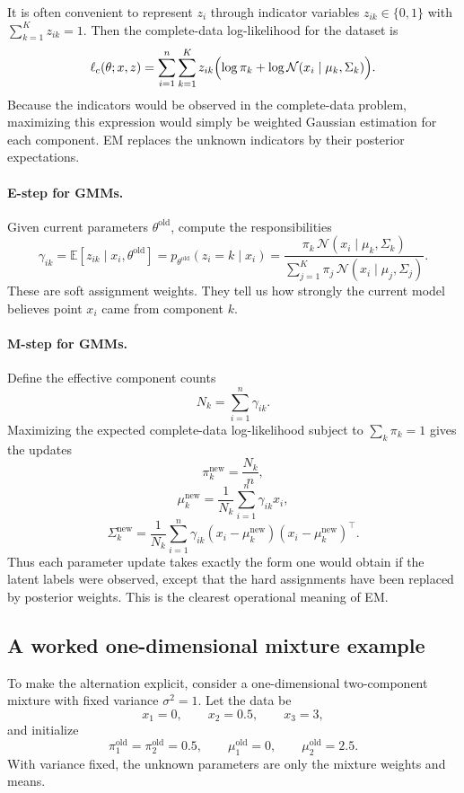 It is often convenient to represent $z_i$ through indicator variables $z_{ik}\in\{0,1\}$ with $\sum_{k=1}^K z_{ik}=1$.
Then the complete-data log-likelihood for the dataset is
\[
\ell_c(\theta;x,z)
=
\sum_{i=1}^n\sum_{k=1}^K z_{ik}
\Bigl(
\log \pi_k + \log \mathcal{N}(x_i\mid \mu_k,\Sigma_k)
\Bigr).
\]
Because the indicators would be observed in the complete-data problem, maximizing this expression would simply be weighted Gaussian estimation for each component.
EM replaces the unknown indicators by their posterior expectations.

\paragraph{E-step for GMMs.}
Given current parameters $\theta^{\mathrm{old}}$, compute the responsibilities
\[
\gamma_{ik}
=
\mathbb{E}[z_{ik}\mid x_i,\theta^{\mathrm{old}}]
=
 p_{\theta^{\mathrm{old}}}(z_i=k\mid x_i)
=
\frac{\pi_k\,\mathcal{N}(x_i\mid \mu_k,\Sigma_k)}{\sum_{j=1}^K \pi_j\,\mathcal{N}(x_i\mid \mu_j,\Sigma_j)}.
\]
These are soft assignment weights.
They tell us how strongly the current model believes point $x_i$ came from component $k$.

\paragraph{M-step for GMMs.}
Define the effective component counts
\[
N_k = \sum_{i=1}^n \gamma_{ik}.
\]
Maximizing the expected complete-data log-likelihood subject to $\sum_k \pi_k=1$ gives the updates
\[
\pi_k^{\mathrm{new}} = \frac{N_k}{n},
\]
\[
\mu_k^{\mathrm{new}} = \frac{1}{N_k}\sum_{i=1}^n \gamma_{ik}x_i,
\]
\[
\Sigma_k^{\mathrm{new}} = \frac{1}{N_k}\sum_{i=1}^n \gamma_{ik}(x_i-\mu_k^{\mathrm{new}})(x_i-\mu_k^{\mathrm{new}})^\top.
\]
Thus each parameter update takes exactly the form one would obtain if the latent labels were observed, except that the hard assignments have been replaced by posterior weights.
This is the clearest operational meaning of EM.

\subsection*{A worked one-dimensional mixture example}

To make the alternation explicit, consider a one-dimensional two-component mixture with fixed variance $\sigma^2=1$.
Let the data be
\[
x_1=0,\qquad x_2=0.5,\qquad x_3=3,
\]
and initialize
\[
\pi_1^{\mathrm{old}}=\pi_2^{\mathrm{old}}=0.5,
\qquad
\mu_1^{\mathrm{old}}=0,
\qquad
\mu_2^{\mathrm{old}}=2.5.
\]
With variance fixed, the unknown parameters are only the mixture weights and means.


